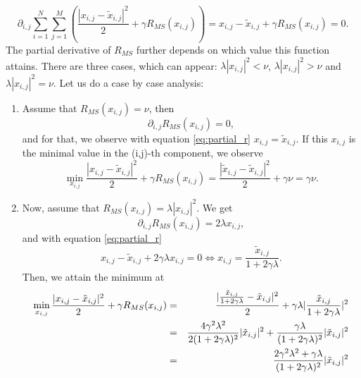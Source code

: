 \documentclass{scrreprt}
\begin{document}
                \begin{equation}
                    \partial_{i,j} \sum_{i = 1}^{N} \sum_{j = 1}^{M} \left( \frac{|x_{i,j} - \tilde{x}_{i,j}|^{2}}{2} + \gamma R_{MS}(x_{i,j}) \right) = x_{i,j} - \tilde{x}_{i,j} + \gamma R_{MS}(x_{i,j}) = 0.
                    \label{eq:partial_r}
                \end{equation}
            The partial derivative of $R_{MS}$ further depends on which value this function attains. There are three cases, which can appear: $\lambda |x_{i,j}|^{2} < \nu$, $\lambda |x_{i,j}|^{2} > \nu$ and $\lambda |x_{i,j}|^{2} = \nu$. Let us do a case by case analysis:
                \begin{enumerate}
                    \item Assume that $R_{MS}(x_{i,j}) = \nu$, then
                        $$
                            \partial_{i,j}R_{MS}(x_{i,j}) = 0,
                        $$
                    and for that, we observe with equation \ref{eq:partial_r} $x_{i,j} = \tilde{x}_{i,j}$. If this $x_{i,j}$ is the minimal value in the (i,j)-th component, we observe
                        $$
                            \min_{x_{i,j}} \frac{|x_{i,j} - \tilde{x}_{i,j}|^{2}}{2} + \gamma R_{MS}(x_{i,j}) = \frac{|\tilde{x}_{i,j} - \tilde{x}_{i,j}|^{2}}{2} + \gamma \nu = \gamma \nu.
                        $$
                    \item Now, assume that $R_{MS}(x_{i,j}) = \lambda|x_{i,j}|^{2}$. We get
                        $$
                            \partial_{i,j}R_{MS}(x_{i,j}) = 2\lambda x_{i,j},
                        $$
                    and with equation \ref{eq:partial_r}
                        $$
                            x_{i,j} - \tilde{x}_{i,j} + 2 \gamma \lambda x_{i,j} = 0 \iff x_{i,j} = \frac{\tilde{x}_{i,j}}{1 + 2 \gamma \lambda}.
                        $$
                    Then, we attain the minimum at
                        \begin{eqnarray}
                            \min_{x_{i,j}} \frac{|x_{i,j} - \tilde{x}_{i,j}|^{2}}{2} + \gamma R_{MS}(x_{i,j}) &=& \frac{|\frac{\tilde{x}_{i,j}}{1 + 2 \gamma \lambda} - \tilde{x}_{i,j}|^{2}}{2} + \gamma \lambda |\frac{\tilde{x}_{i,j}}{1 + 2 \gamma \lambda}|^{2} \notag \\
                            &=& \frac{4\gamma^{2}\lambda^{2}}{2(1 + 2\gamma\lambda)^{2}} |\tilde{x}_{i,j}|^{2} + \frac{\gamma\lambda}{(1 + 2\gamma\lambda)^{2}} |\tilde{x}_{i,j}|^{2} \notag \\
                            &=& \frac{2\gamma^{2}\lambda^{2} + \gamma\lambda}{(1 + 2\gamma\lambda)^{2}} |\tilde{x}_{i,j}|^{2} \notag \\

\end{eqnarray}
\end{enumerate}
\end{document}
